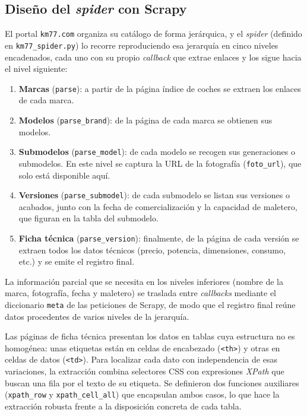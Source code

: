 \subsection{Diseño del \emph{spider} con Scrapy}
\label{sec:impl-spider}

El portal \texttt{km77.com} organiza su catálogo de forma jerárquica, y el
\emph{spider} (definido en \texttt{km77\_spider.py}) lo recorre reproduciendo
esa jerarquía en cinco niveles encadenados, cada uno con su propio
\emph{callback} que extrae enlaces y los sigue hacia el nivel siguiente:

\begin{enumerate}
    \item \textbf{Marcas} (\texttt{parse}): a partir de la página índice de
    coches se extraen los enlaces de cada marca.
    \item \textbf{Modelos} (\texttt{parse\_brand}): de la página de cada marca
    se obtienen sus modelos.
    \item \textbf{Submodelos} (\texttt{parse\_model}): de cada modelo se
    recogen sus generaciones o submodelos. En este nivel se captura la URL de la
    fotografía (\texttt{foto\_url}), que solo está disponible aquí.
    \item \textbf{Versiones} (\texttt{parse\_submodel}): de cada submodelo se
    listan sus versiones o acabados, junto con la fecha de comercialización y la
    capacidad de maletero, que figuran en la tabla del submodelo.
    \item \textbf{Ficha técnica} (\texttt{parse\_version}): finalmente, de la
    página de cada versión se extraen todos los datos técnicos (precio,
    potencia, dimensiones, consumo, etc.) y se emite el registro final.
\end{enumerate}

La información parcial que se necesita en los niveles inferiores (nombre de la
marca, fotografía, fecha y maletero) se traslada entre \emph{callbacks} mediante
el diccionario \texttt{meta} de las peticiones de Scrapy, de modo que el registro
final reúne datos procedentes de varios niveles de la jerarquía.

Las páginas de ficha técnica presentan los datos en tablas cuya estructura no es
homogénea: unas etiquetas están en celdas de encabezado (\texttt{<th>}) y otras
en celdas de datos (\texttt{<td>}). Para localizar cada dato con independencia de
esas variaciones, la extracción combina selectores CSS con expresiones
\emph{XPath} que buscan una fila por el texto de su etiqueta. Se definieron dos
funciones auxiliares (\texttt{xpath\_row} y \texttt{xpath\_cell\_all}) que
encapsulan ambos casos, lo que hace la extracción robusta frente a la disposición
concreta de cada tabla.

